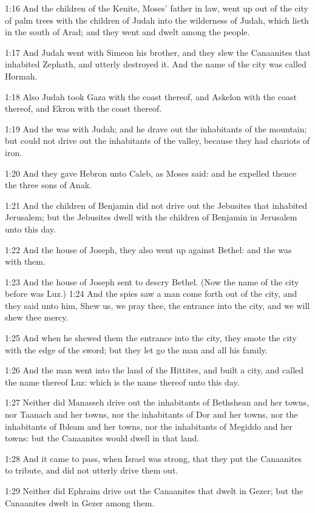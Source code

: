 1:16 And the children of the Kenite, Moses' father in law, went up out
of the city of palm trees with the children of Judah into the
wilderness of Judah, which lieth in the south of Arad; and they went
and dwelt among the people.

1:17 And Judah went with Simeon his brother, and they slew the
Canaanites that inhabited Zephath, and utterly destroyed it. And the
name of the city was called Hormah.

1:18 Also Judah took Gaza with the coast thereof, and Askelon with the
coast thereof, and Ekron with the coast thereof.

1:19 And the \LORD was with Judah; and he drave out the inhabitants of
the mountain; but could not drive out the inhabitants of the valley,
because they had chariots of iron.

1:20 And they gave Hebron unto Caleb, as Moses said: and he expelled
thence the three sons of Anak.

1:21 And the children of Benjamin did not drive out the Jebusites that
inhabited Jerusalem; but the Jebusites dwell with the children of
Benjamin in Jerusalem unto this day.

1:22 And the house of Joseph, they also went up against Bethel: and
the \LORD was with them.

1:23 And the house of Joseph sent to descry Bethel. (Now the name of
the city before was Luz.)  1:24 And the spies saw a man come forth out
of the city, and they said unto him, Shew us, we pray thee, the
entrance into the city, and we will shew thee mercy.

1:25 And when he shewed them the entrance into the city, they smote
the city with the edge of the sword; but they let go the man and all
his family.

1:26 And the man went into the land of the Hittites, and built a city,
and called the name thereof Luz: which is the name thereof unto this
day.

1:27 Neither did Manasseh drive out the inhabitants of Bethshean and
her towns, nor Taanach and her towns, nor the inhabitants of Dor and
her towns, nor the inhabitants of Ibleam and her towns, nor the
inhabitants of Megiddo and her towns: but the Canaanites would dwell
in that land.

1:28 And it came to pass, when Israel was strong, that they put the
Canaanites to tribute, and did not utterly drive them out.

1:29 Neither did Ephraim drive out the Canaanites that dwelt in Gezer;
but the Canaanites dwelt in Gezer among them.

